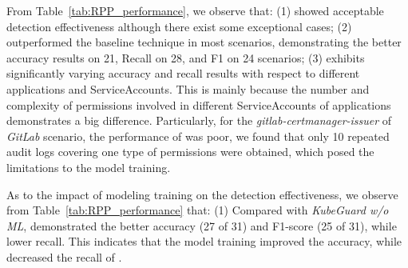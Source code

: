 \documentclass[conference]{IEEEtran}
\theoremstyle{definition}
\begin{document}
From Table~\ref{tab:RPP_performance}, we observe that: (1) \kg showed acceptable detection effectiveness although there exist some exceptional cases; (2) \kg outperformed the baseline technique in most scenarios, demonstrating the better accuracy results on 21, Recall on 28, and F1 on 24 scenarios; (3) \kg exhibits significantly varying accuracy and recall results with respect to different applications and ServiceAccounts. This is mainly because the number and complexity of permissions involved in different ServiceAccounts of applications demonstrates a big difference. Particularly, for the \textit{gitlab-certmanager-issuer} of \textit{GitLab} scenario, the performance of \kg was poor, we found that only 10 repeated audit logs  covering one type of permissions were obtained, which posed the limitations to the model training.

As to the impact of modeling training on the detection effectiveness, we observe from Table~\ref{tab:RPP_performance} that: 
(1) Compared with \textit{KubeGuard w/o ML}, \kg demonstrated the better accuracy (27 of 31) and F1-score (25 of 31), while lower recall. This indicates that the model training improved the accuracy, while decreased the recall of \kg. 
\end{document}

